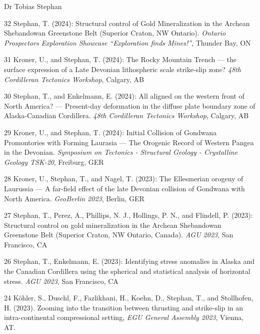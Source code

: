 \documentclass[10pt, paper=letter]{scrartcl} %
\begin{document}
\begin{cv}{\textsf{Dr Tobias Stephan}}
\begin{cvlist}{}
        \item[32] Stephan, T. (2024): Structural control of Gold Mineralization in the Archean Shebandowan Greenstone Belt (Superior Craton, NW Ontario). \textit{Ontario Prospectors Exploration Showcase \enquote{Exploration finds Mines!}}, Thunder Bay, ON
        \item[31] Kroner, U., and Stephan, T. (2024): The Rocky Mountain Trench --- the surface expression of a Late Devonian lithospheric scale strike-slip zone? \textit{48th Cordilleran Tectonics Workshop}, Calgary, AB
        \item[30] Stephan, T., and Enkelmann, E. (2024): All aligned on the western front of North America? --– Present-day deformation in the diffuse plate boundary zone of Alaska-Canadian Cordillera. \textit{48th Cordilleran Tectonics Workshop}, Calgary, AB
        \item[29] Kroner, U., and Stephan, T. (2024): Initial Collision of Gondwana Promontories with Forming Laurasia --- The Orogenic Record of Western Pangea in the Devonian. \textit{Symposium on Tectonics - Structural Geology - Crystalline Geology TSK-20}, Freiburg, GER
        \item[28] Kroner, U., Stephan, T., and Nagel, T. (2023): The Ellesmerian orogeny of Laurussia –-- A far-field effect of the late Devonian collision of Gondwana with North America. \textit{GeoBerlin 2023}, Berlin, GER
        \item[27] Stephan, T., Perez, A., Phillips, N. J., Hollings, P. N., and Flindell, P. (2023): Structural control on gold mineralization in the Archean Shebandowan Greenstone Belt (Superior Craton, NW Ontario, Canada). \textit{AGU 2023}, San Francisco, CA
        \item[26] Stephan, T., Enkelmann, E. (2023): Identifying stress anomalies in Alaska and the Canadian Cordillera using the spherical and statistical analysis of horizontal stress. \textit{AGU 2023}, San Francisco, CA
        \item[24] K\"ohler, S., Duschl, F., Fazlikhani, H., Koehn, D., Stephan, T., and Stollhofen, H. (2023).  Zooming into the transition between thrusting and strike-slip in an intra-continental compressional setting, \textit{EGU General Assembly 2023}, Vienna, AT. 

\end{cvlist}
\end{cv}
\end{document}
